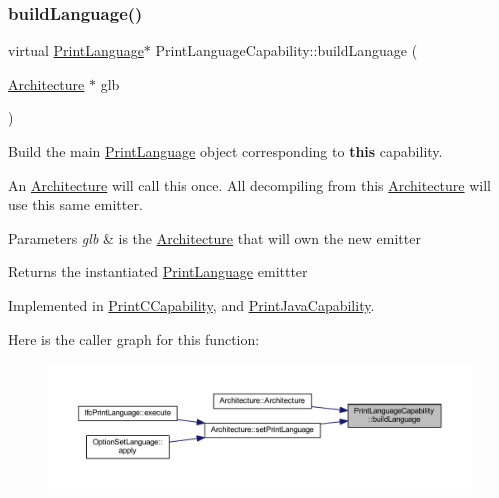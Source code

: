 \subsubsection{\texorpdfstring{buildLanguage()}{buildLanguage()}}
{\footnotesize\ttfamily virtual \mbox{\hyperlink{class_print_language}{Print\+Language}}$\ast$ Print\+Language\+Capability\+::build\+Language (\begin{DoxyParamCaption}\item[{\mbox{\hyperlink{class_architecture}{Architecture}} $\ast$}]{glb }\end{DoxyParamCaption})\hspace{0.3cm}{\ttfamily [pure virtual]}}



Build the main \mbox{\hyperlink{class_print_language}{Print\+Language}} object corresponding to {\bfseries{this}} capability. 

An \mbox{\hyperlink{class_architecture}{Architecture}} will call this once. All decompiling from this \mbox{\hyperlink{class_architecture}{Architecture}} will use this same emitter. 
\begin{DoxyParams}{Parameters}
{\em glb} & is the \mbox{\hyperlink{class_architecture}{Architecture}} that will own the new emitter \\
\hline
\end{DoxyParams}
\begin{DoxyReturn}{Returns}
the instantiated \mbox{\hyperlink{class_print_language}{Print\+Language}} emittter 
\end{DoxyReturn}


Implemented in \mbox{\hyperlink{class_print_c_capability_a248a6da5b381c20a11eb43e11f58f60f}{Print\+C\+Capability}}, and \mbox{\hyperlink{class_print_java_capability_ada79946f1067abeecf609e64bc348a88}{Print\+Java\+Capability}}.

Here is the caller graph for this function\+:
\nopagebreak
\begin{figure}[H]
\begin{center}
\leavevmode
\includegraphics[width=350pt]{class_print_language_capability_a50e2abb3f0b4cf3ab67556f77eacc51e_icgraph}
\end{center}
\end{figure}
\mbox{\label{class_print_language_capability_a5feea559122bb1d976707540eb4b32ff}} 
